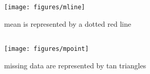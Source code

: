 \documentclass[
]{book}
\begin{document}
\begin{columns-nocenter}

\begin{column}

\begin{figure}
\texttt{[image: figures/mline]} \caption{mean is represented by a dotted red line}\label{fig:unnamed-chunk-134}
\end{figure}

\end{column}

\begin{column}

\begin{figure}
\texttt{[image: figures/mpoint]} \caption{missing data are represented by tan triangles}\label{fig:unnamed-chunk-135}
\end{figure}

\end{column}

\begin{column}

\end{column}

\end{columns-nocenter}
\end{document}
